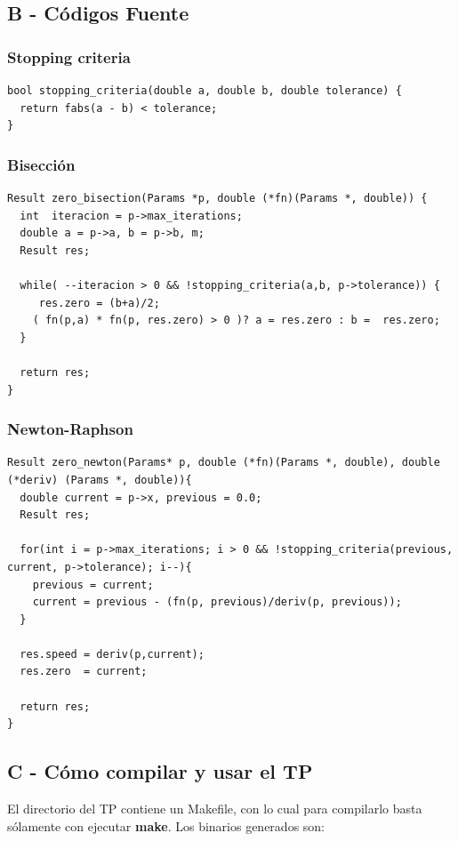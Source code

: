 \documentclass[a4paper]{article}
\begin{document}
\subsection{B - Códigos Fuente}

\subsubsection{Stopping criteria}
\begin{verbatim}
bool stopping_criteria(double a, double b, double tolerance) {
  return fabs(a - b) < tolerance;
}
\end{verbatim}

\subsubsection{Bisección}
\begin{verbatim}
Result zero_bisection(Params *p, double (*fn)(Params *, double)) {
  int  iteracion = p->max_iterations;
  double a = p->a, b = p->b, m;
  Result res;

  while( --iteracion > 0 && !stopping_criteria(a,b, p->tolerance)) {
     res.zero = (b+a)/2;
    ( fn(p,a) * fn(p, res.zero) > 0 )? a = res.zero : b =  res.zero;
  }

  return res;
}
\end{verbatim}


\subsubsection{Newton-Raphson}
\begin{verbatim}
Result zero_newton(Params* p, double (*fn)(Params *, double), double (*deriv) (Params *, double)){
  double current = p->x, previous = 0.0;
  Result res;

  for(int i = p->max_iterations; i > 0 && !stopping_criteria(previous, current, p->tolerance); i--){
    previous = current;
    current = previous - (fn(p, previous)/deriv(p, previous));
  }

  res.speed = deriv(p,current);
  res.zero  = current;

  return res;
}
\end{verbatim}

\subsection{C - Cómo compilar y usar el TP}
El directorio del TP contiene un Makefile, con lo cual para compilarlo basta sólamente con ejecutar \textbf{make}. Los binarios generados son: 
\end{document}
